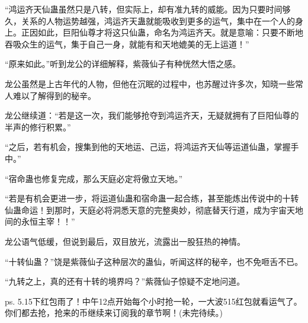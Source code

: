 \begin{this_body}
“鸿运齐天仙蛊虽然只是八转，但实际上，却有准九转的威能。因为只要时间够久，关系的人物运势越强，鸿运齐天蛊就能吸收到更多的运气，集中在一个人的身上。正因如此，巨阳仙尊才将这只仙蛊，命名为鸿运齐天。就是意喻：只要不断地吞吸众生的运气，集于自己一身，就能有和天地媲美的无上运道！”

“原来如此。”听到龙公的详细解释，紫薇仙子有种恍然大悟之感。

龙公虽然是上古年代的人物，但他在沉眠的过程中，也苏醒过许多次，知晓一些常人难以了解得到的秘辛。

龙公继续道：“若是这一次，我们能够抢夺到鸿运齐天，无疑就拥有了巨阳仙尊的半声的修行积累。”

“之后，若有机会，搜集到他的天地运、己运，将鸿运齐天仙等运道仙蛊，掌握手中。”

“宿命蛊也修复完成，那么天庭必定将傲立天地。”

“若是有机会更进一步，将运道仙蛊和宿命蛊一起合练，甚至能炼出传说中的十转仙蛊命运！到那时，天庭必将洞悉天意的完整奥妙，彻底替天行道，成为宇宙天地间的永恒主宰！！”

龙公语气低缓，但说到最后，双目放光，流露出一股狂热的神情。

“十转仙蛊？”饶是紫薇仙子这种层次的蛊仙，听闻这样的秘辛，也不免咂舌不已。

“九转之上，真的还有十转的境界吗？”紫薇仙子惊疑不定地问道。

ps. 5.15下红包雨了！中午12点开始每个小时抢一轮，一大波515红包就看运气了。你们都去抢，抢来的币继续来订阅我的章节啊！(未完待续。)

\end{this_body}

